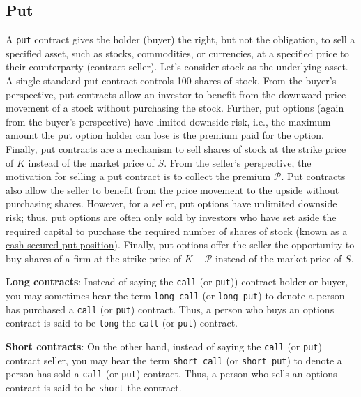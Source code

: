 \documentclass[11pt]{article}
\theoremstyle{definition}
\begin{document}
\subsection{Put}
A \texttt{put} contract gives the holder (buyer) the right, but not the obligation, to sell a specified asset, 
such as stocks, commodities, or currencies, at a specified price to their counterparty (contract seller). 
Let's consider stock as the underlying asset. A single standard put contract controls 100 shares of stock.
From the buyer's perspective, put contracts allow an investor to benefit from the downward price movement of a stock without purchasing the stock. 
Further, put options (again from the buyer's perspective) have limited downside risk, i.e., the maximum amount the put option holder can lose is the premium paid for the option. 
Finally, put contracts are a mechanism to sell shares of stock at the strike price of $K$ instead of the market price of $S$. 
From the seller's perspective, the motivation for selling a put contract is to collect the premium $\mathcal{P}$. 
Put contracts also allow the seller to benefit from the price movement to the upside without purchasing shares.
However, for a seller, put options have unlimited downside risk; 
thus, put options are often only sold by investors who have set aside the required capital to purchase the required number of shares of stock 
(known as a \href{https://www.fidelity.com/learning-center/investment-products/options/know-about-cash-covered-puts}{cash-secured put position}).
Finally, put options offer the seller the opportunity to buy shares of a firm at the strike price of $K-\mathcal{P}$ instead of the market price of $S$.

\begin{concept}\label{concept:long-short-contracts}

	\textbf{Long contracts}: Instead of saying the \texttt{call} (or \texttt{put})) contract holder or buyer, you may sometimes hear the term \texttt{long call} (or \texttt{long put}) to denote a person has purchased a \texttt{call} (or \texttt{put}) contract.
	Thus, a person who buys an options contract is said to be \texttt{long} the \texttt{call} (or \texttt{put}) contract.
	
	\vspace{0.01in}
	\noindent\textbf{Short contracts}: On the other hand, instead of saying the \texttt{call} (or \texttt{put}) contract seller, you may hear the term \texttt{short call} (or \texttt{short put}) to denote a person has sold a \texttt{call} (or \texttt{put}) contract.
	Thus, a person who sells an options contract is said to be \texttt{short} the contract.
\end{concept}
\end{document}
